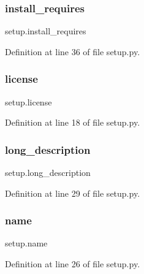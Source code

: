 \subsubsection{\texorpdfstring{install\+\_\+requires}{install\_requires}}
{\footnotesize\ttfamily setup.\+install\+\_\+requires}



Definition at line 36 of file setup.\+py.

\mbox{\label{namespacesetup_a8ed6f50a28bd6a8794f8e1153baa6de9}} 
\subsubsection{\texorpdfstring{license}{license}}
{\footnotesize\ttfamily setup.\+license}



Definition at line 18 of file setup.\+py.

\mbox{\label{namespacesetup_a4cda9dbfb952875376a0749fe08a5bde}} 
\subsubsection{\texorpdfstring{long\+\_\+description}{long\_description}}
{\footnotesize\ttfamily setup.\+long\+\_\+description}



Definition at line 29 of file setup.\+py.

\mbox{\label{namespacesetup_ab3a7a0638d76a01367c5bc3cc699447f}} 
\subsubsection{\texorpdfstring{name}{name}}
{\footnotesize\ttfamily setup.\+name}



Definition at line 26 of file setup.\+py.

\mbox{\label{namespacesetup_aff2375a361fd5865c77bd9aa093be747}} 

